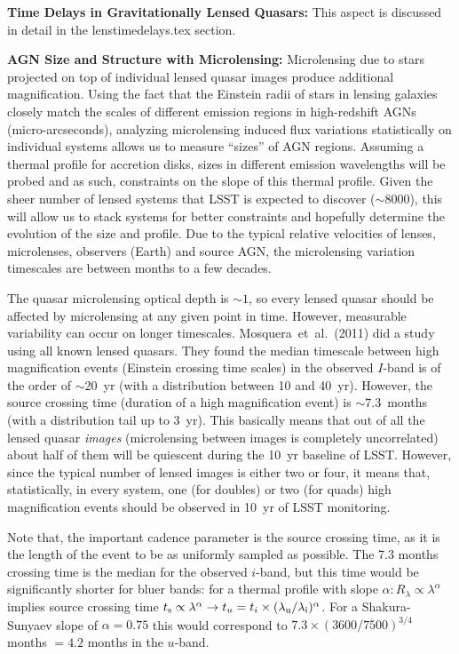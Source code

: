 {\bf Time Delays in Gravitationally Lensed Quasars:} This aspect is discussed in detail in the lenstimedelays.tex section.

{\bf AGN Size and Structure with Microlensing:} Microlensing due to stars projected on top of individual lensed quasar images produce additional magnification. Using the fact that the Einstein radii of stars in lensing galaxies closely match the scales of different emission regions in high-redshift AGNs (micro-arcseconds), analyzing microlensing induced flux variations statistically on individual systems allows us to measure ``sizes'' of AGN regions.
%
Assuming a thermal profile for accretion disks, sizes in different emission wavelengths will be probed and as such, constraints on the slope of this thermal profile. Given the sheer number of lensed systems that LSST is expected to discover ($\sim8000$), this will allow us to stack systems for better constraints and hopefully determine the evolution of the size and profile. Due to the typical relative velocities of lenses, microlenses, observers (Earth) and source AGN, the microlensing variation timescales are between months to a few decades.

The quasar microlensing optical depth is $\sim1$, so every lensed quasar should be affected by microlensing at any given point in time. However, measurable variability can occur on longer timescales. Mosquera~et~al.~(2011) did a study using all known lensed quasars. They found the median timescale between high magnification events (Einstein crossing time scales) in the observed $I$-band is of the order of $\sim20$~yr (with a distribution between 10 and 40~yr). However, the source crossing time (duration of a high magnification event) is $\sim7.3$~months (with a distribution tail up to 3~yr). This basically means that out of all the lensed quasar {\em images} (microlensing between images is completely uncorrelated) about half of them will be quiescent during the 10~yr baseline of LSST. However, since the typical number of lensed images is either two or four, it means that, statistically, in every system, one (for doubles) or two (for quads) high magnification events should be observed in 10~yr of LSST monitoring.

Note that, the important cadence parameter is the source crossing time, as it is the length of the event to be as uniformly sampled as possible. The 7.3 months crossing time is the median for the observed $i$-band, but this time would be significantly shorter for bluer bands: for a thermal profile with slope $\alpha: R_\lambda \propto \lambda^\alpha$ implies source crossing time $t_{\rm s} \propto \lambda^\alpha \rightarrow t_u=t_i \times (\lambda_{\rm u} / \lambda_{\rm i})^{\alpha}$. For a Shakura-Sunyaev slope of $\alpha=0.75$ this would correspond to $7.3 \times (3600/7500)^{3/4}$ months $= 4.2$ months in the $u$-band.


